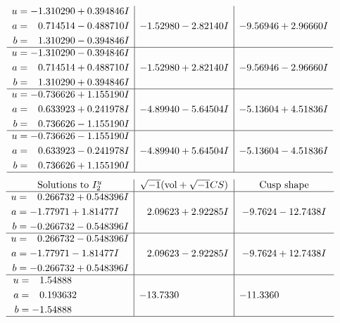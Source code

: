 \documentclass[1p]{elsarticle_modified}
\theoremstyle{definition}
\newcommand{\I}{\sqrt{-1}}
\begin{document}
$$\begin{array}{c|c|c}
\begin{aligned}
u &= -1.310290 + 0.394846 I \\
a &= \phantom{-}0.714514 - 0.488710 I \\
b &= \phantom{-}1.310290 - 0.394846 I\end{aligned}
 & -1.52980 - 2.82140 I & -9.56946 + 2.96660 I \\ \hline\begin{aligned}
u &= -1.310290 - 0.394846 I \\
a &= \phantom{-}0.714514 + 0.488710 I \\
b &= \phantom{-}1.310290 + 0.394846 I\end{aligned}
 & -1.52980 + 2.82140 I & -9.56946 - 2.96660 I \\ \hline\begin{aligned}
u &= -0.736626 + 1.155190 I \\
a &= \phantom{-}0.633923 + 0.241978 I \\
b &= \phantom{-}0.736626 - 1.155190 I\end{aligned}
 & -4.89940 - 5.64504 I & -5.13604 + 4.51836 I \\ \hline\begin{aligned}
u &= -0.736626 - 1.155190 I \\
a &= \phantom{-}0.633923 - 0.241978 I \\
b &= \phantom{-}0.736626 + 1.155190 I\end{aligned}
 & -4.89940 + 5.64504 I & -5.13604 - 4.51836 I\\
 \hline 
 \end{array}$$\newpage$$\begin{array}{c|c|c}  
\text{Solutions to }I^u_{2}& \I (\text{vol} + \sqrt{-1}CS) & \text{Cusp shape}\\
 \hline 
\begin{aligned}
u &= \phantom{-}0.266732 + 0.548396 I \\
a &= -1.77971 + 1.81477 I \\
b &= -0.266732 - 0.548396 I\end{aligned}
 & \phantom{-}2.09623 + 2.92285 I & -9.7624 - 12.7438 I \\ \hline\begin{aligned}
u &= \phantom{-}0.266732 - 0.548396 I \\
a &= -1.77971 - 1.81477 I \\
b &= -0.266732 + 0.548396 I\end{aligned}
 & \phantom{-}2.09623 - 2.92285 I & -9.7624 + 12.7438 I \\ \hline\begin{aligned}
u &= \phantom{-}1.54888\phantom{ +0.000000I} \\
a &= \phantom{-}0.193632\phantom{ +0.000000I} \\
b &= -1.54888\phantom{ +0.000000I}\end{aligned}
 & -13.7330\phantom{ +0.000000I} & -11.3360\phantom{ +0.000000I}\\
 \hline 
 \end{array}$$\newpage\newpage\renewcommand{\arraystretch}{1}
\end{document}
